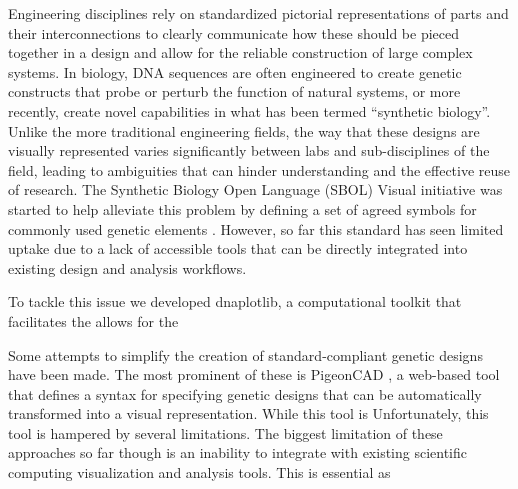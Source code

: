 \documentclass{bioinfo}
\begin{document}
Engineering disciplines rely on standardized pictorial representations of parts and their interconnections to clearly communicate how these should be pieced together in a design and allow for the reliable construction of large complex systems. In biology, DNA sequences are often engineered to create genetic constructs that probe or perturb the function of natural systems, or more recently, create novel capabilities in what has been termed ``synthetic biology''. Unlike the more traditional engineering fields, the way that these designs are visually represented varies significantly between labs and sub-disciplines of the field, leading to ambiguities that can hinder understanding and the effective reuse of research. The Synthetic Biology Open Language (SBOL) Visual initiative was started to help alleviate this problem by defining a set of agreed symbols for commonly used genetic elements \citep{Quinn13a}. However, so far this standard has seen limited uptake due to a lack of accessible tools that can be directly integrated into existing design and analysis workflows.

To tackle this issue we developed dnaplotlib, a computational toolkit that facilitates the allows for the 

Some attempts to simplify the creation of standard-compliant genetic designs have been made. The most prominent of these is PigeonCAD \citep{Bhatia13a}, a web-based tool that defines a syntax for specifying genetic designs that can be automatically transformed into a visual representation. While this tool is Unfortunately, this tool is hampered by several limitations. The biggest limitation of these approaches so far though is an inability to integrate with existing scientific computing visualization and analysis tools. This is essential as 
\end{document}
